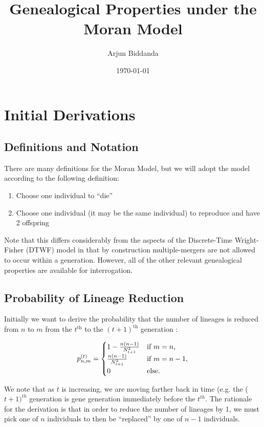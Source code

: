 \documentclass[11pt]{article}
\title{Genealogical Properties under the Moran Model}\author{Arjun Biddanda}
\date{\today}
\begin{document}
\maketitle

\section{Initial Derivations}

\subsection{Definitions and Notation}

There are many definitions for the Moran Model, but we will adopt the model according to the following definition:

\begin{enumerate}
	\item Choose one individual to ``die''
	\item Choose one individual (it may be the same individual) to reproduce and have 2 offspring
\end{enumerate}

Note that this differs considerably from the aspects of the Discrete-Time Wright-Fisher (DTWF) model in that by construction multiple-mergers are not allowed to occur within a generation. However, all of the other relevant genealogical properties are available for interrogation.

\subsection{Probability of Lineage Reduction}
Initially we want to derive the probability that the number of lineages is reduced from $n$ to $m$ from the $t^{\text{th}}$ to the $(t+1)^{\text{th}}$ generation :

\begin{equation}
	p^{(t)}_{n,m} = 
	\begin{cases} 1 - \frac{n(n-1)}{N^2_{t+1}}  & \text{if $m = n$,}
		\\
		\frac{n(n-1)}{N^2_{t+1}} &\text{if $ m = n - 1$,}
		\\
		0 &\text{else.}
	\end{cases}
\end{equation}

We note that as $t$ is increasing, we are moving farther back in time (e.g. the ($t+1)^{th}$ generation is gene generation immediately before the $t^{th}$. The rationale for the derivation is that in order to reduce the number of lineages by 1, we must pick one of $n$ individuals to then be ``replaced'' by one of $n-1$ individuals. 
\end{document}
